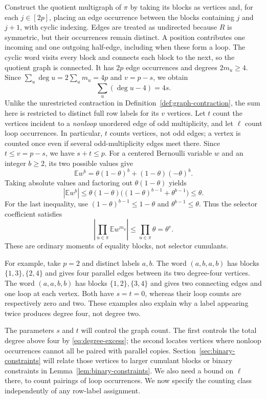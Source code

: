 \documentclass[11pt]{article}
\theoremstyle{definition}
\theoremstyle{remark}
\theoremstyle{plain}
\newcommand{\E}{\mathbb E}
\begin{document}
Construct the quotient multigraph of $\pi$ by taking its blocks as vertices
and, for each $j\in[2p]$, placing an edge occurrence between the
blocks containing $j$ and $j+1$, with cyclic indexing.
Edges are treated as undirected because $R$ is symmetric, but
their occurrences remain distinct. A position contributes one
incoming and one outgoing half-edge, including when these form a
loop. The cyclic word visits every block and connects each block to
the next, so the quotient graph is connected. It has \(2p\) edge
occurrences and degrees \(2m_u\ge4\). Since
$\sum_u\deg u=2\sum_u m_u=4p$ and $v=p-s$, we obtain
\begin{equation}\label{eq:degree-excess}
                         \sum_u(\deg u-4)=4s.
\end{equation}
Unlike the unrestricted contraction in
Definition~\ref{def:graph-contraction}, the sum here is restricted
to distinct full row labels for its \(v\) vertices.
Let \(t\) count the vertices incident to a
\emph{nonloop} unordered edge of odd multiplicity, and let \(\ell\)
count loop occurrences. In particular, $t$ counts vertices, not odd
edges; a vertex is counted once even if several odd-multiplicity
edges meet there. Since $t\le v=p-s$, we have \(s+t\le p\).
For a centered Bernoulli variable \(w\) and an integer \(b\ge2\),
its two possible values give
\[
 \E w^b=\theta(1-\theta)^b+(1-\theta)(-\theta)^b.
\]
Taking absolute values and factoring out $\theta(1-\theta)$ yields
\begin{equation}\label{eq:selector-moment}
 |\E w^b|
 \le\theta(1-\theta)\big((1-\theta)^{b-1}+\theta^{b-1}\big)
 \le\theta.
\end{equation}
For the last inequality, use $(1-\theta)^{b-1}\le1-\theta$ and
$\theta^{b-1}\le\theta$. Thus the selector coefficient satisfies
\[
 \left|\prod_{u\in\pi}\E w^{m_u}\right|
 \le\prod_{u\in\pi}\theta=\theta^v.
\]
These are ordinary moments of equality blocks, not selector cumulants.

For example, take $p=2$ and distinct labels $a,b$. The word
$(a,b,a,b)$ has blocks $\{1,3\},\{2,4\}$ and gives four parallel
edges between its two degree-four vertices. The word $(a,a,b,b)$
has blocks $\{1,2\},\{3,4\}$ and gives two connecting edges and one
loop at each vertex. Both have $s=t=0$, whereas their loop counts
are respectively zero and two. These examples also explain why a
label appearing twice produces degree four, not degree two.

The parameters $s$ and $t$ will control the graph count. The first
controls the total degree above four by \eqref{eq:degree-excess};
the second locates vertices where nonloop occurrences cannot all be
paired with parallel copies. Section~\ref{sec:binary-constraints}
will relate those vertices to larger cumulant blocks or binary
constraints in Lemma~\ref{lem:binary-constraints}. We also need a
bound on $\ell$ there, to count pairings
of loop occurrences. We now specify the counting class independently
of any row-label assignment.
\end{document}
